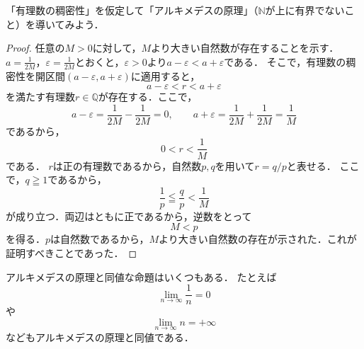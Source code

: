 「有理数の稠密性」を仮定して「アルキメデスの原理」（$\mathbb{N}$が上に有界でないこと）を導いてみよう．

\begin{tleftbar}
  \begin{proof}
    任意の$M > 0$に対して，$M$より大きい自然数が存在することを示す．
    $a = \frac{1}{2M}$，$\varepsilon = \frac{1}{2M}$とおくと，$\varepsilon > 0$より$a - \varepsilon < a + \varepsilon$である．
    そこで，有理数の稠密性を開区間$( a - \varepsilon, a + \varepsilon )$に適用すると，
    \[
      a - \varepsilon < r < a + \varepsilon
    \]
    を満たす有理数$r \in \mathbb{Q}$が存在する．ここで，
    \[
      a - \varepsilon = \frac{1}{2M} - \frac{1}{2M} = 0,
      \qquad
      a + \varepsilon = \frac{1}{2M} + \frac{1}{2M} = \frac{1}{M}
    \]
    であるから，
    \[
      0 < r < \frac{1}{M}
    \]
    である．
    $r$は正の有理数であるから，自然数$p,q$を用いて$r = q/p$と表せる．
    ここで，$q \geqq 1$であるから，
    \[
      \frac{1}{p} \leqq \frac{q}{p} < \frac{1}{M}
    \]
    が成り立つ．両辺はともに正であるから，逆数をとって
    \[
      M < p
    \]
    を得る．$p$は自然数であるから，$M$より大きい自然数の存在が示された．これが証明すべきことであった．
  \end{proof}
\end{tleftbar}

アルキメデスの原理と同値な命題はいくつもある．
たとえば
\[
  \lim_{n \to \infty} \frac{1}{n} = 0
\]
や
\[
  \lim_{n \to \infty} n = +\infty
\]
などもアルキメデスの原理と同値である．
